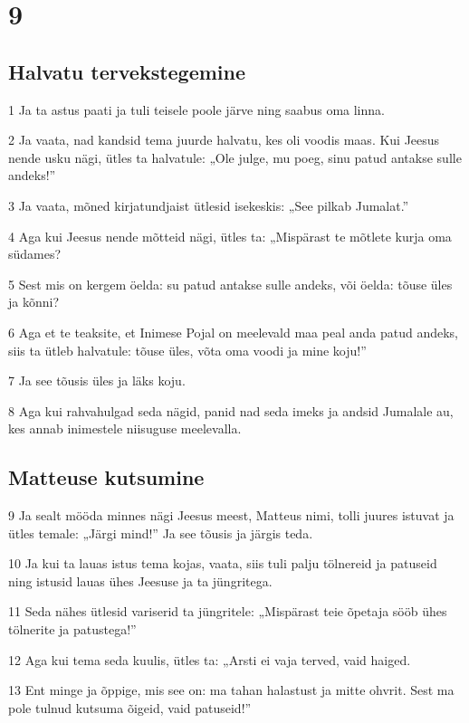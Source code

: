 \chapter{9}

\section*{Halvatu tervekstegemine}

\par 1 Ja ta astus paati ja tuli teisele poole järve ning saabus oma linna.
\par 2 Ja vaata, nad kandsid tema juurde halvatu, kes oli voodis maas. Kui Jeesus nende usku nägi, ütles ta halvatule: „Ole julge, mu poeg, sinu patud antakse sulle andeks!”
\par 3 Ja vaata, mõned kirjatundjaist ütlesid isekeskis: „See pilkab Jumalat.”
\par 4 Aga kui Jeesus nende mõtteid nägi, ütles ta: „Mispärast te mõtlete kurja oma südames?
\par 5 Sest mis on kergem öelda: su patud antakse sulle andeks, või öelda: tõuse üles ja kõnni?
\par 6 Aga et te teaksite, et Inimese Pojal on meelevald maa peal anda patud andeks, siis ta ütleb halvatule: tõuse üles, võta oma voodi ja mine koju!”
\par 7 Ja see tõusis üles ja läks koju.
\par 8 Aga kui rahvahulgad seda nägid, panid nad seda imeks ja andsid Jumalale au, kes annab inimestele niisuguse meelevalla.

\section*{Matteuse kutsumine}

\par 9 Ja sealt mööda minnes nägi Jeesus meest, Matteus nimi, tolli juures istuvat ja ütles temale: „Järgi mind!” Ja see tõusis ja järgis teda.
\par 10 Ja kui ta lauas istus tema kojas, vaata, siis tuli palju tölnereid ja patuseid ning istusid lauas ühes Jeesuse ja ta jüngritega.
\par 11 Seda nähes ütlesid variserid ta jüngritele: „Mispärast teie õpetaja sööb ühes tölnerite ja patustega!”
\par 12 Aga kui tema seda kuulis, ütles ta: „Arsti ei vaja terved, vaid haiged.
\par 13 Ent minge ja õppige, mis see on: ma tahan halastust ja mitte ohvrit. Sest ma pole tulnud kutsuma õigeid, vaid patuseid!”

